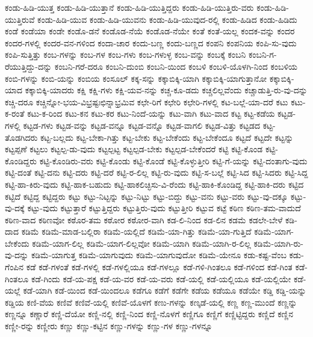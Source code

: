 {ಕಂಡು-ಹಿಡಿ-ಯುತ್ತ
ಕಂಡು-ಹಿಡಿ-ಯುತ್ತಾನೆ
ಕಂಡು-ಹಿಡಿ-ಯುತ್ತಿದ್ದರು
ಕಂಡು-ಹಿಡಿ-ಯುತ್ತಿರು-ವರು
ಕಂಡು-ಹಿಡಿ-ಯುತ್ತಿರುವೆ
ಕಂಡು-ಹಿಡಿ-ಯುವ
ಕಂಡು-ಹಿಡಿ-ಯುವನು
ಕಂಡು-ಹಿಡಿ-ಯುವುದ-ರಲ್ಲಿ
ಕಂಡು-ಹಿಡಿದ
ಕಂಡು-ಹಿಡಿದು
ಕಂಡೆ
ಕಂಡೆಯಾ
ಕಂಡೇ
ಕಂಡೊ-ಡನೆ
ಕಂಡೊಡ-ನೆಯೆ
ಕಂಡೊಡ-ನೆಯೇ
ಕಂತೆ
ಕಂತೆ-ಯಲ್ಲ
ಕಂದಕ-ವನ್ನು
ಕಂದರ
ಕಂದರ-ಗಳಲ್ಲಿ
ಕಂದರ-ವನ-ಗಳಿಂದ
ಕಂದಾ-ಚಾರ
ಕಂದು-ಬಣ್ಣ
ಕಂದು-ಬಣ್ಣದ
ಕಂಪನಿ
ಕಂಪನಿಯ
ಕಂಪಿ-ಸು-ವುದು
ಕಂಪಿ-ಸುತ್ತಿತ್ತು
ಕಂಬ-ಗಳನ್ನು
ಕಂಬ-ಗಳ
ಕಂಬ-ಗಳು
ಕಂಬ-ಗಳುಳ್ಳ
ಕಂಬ-ವನ್ನು
ಕಂಬಕ್ಕೆ
ಕಂಬನಿ
ಕಂಬನಿ-ಗ-ರೆಯುತ್ತಿದ್ದು-ದನ್ನು
ಕಂಬನಿ-ಗರೆ-ದರೂ
ಕಂಬನಿ-ದುಂಬಿ
ಕಂಬನಿ-ಯಿಂದ
ಕಂಬಳಿ
ಕಂಬಳಿ-ಯೊಳಗಿ-ನಿಂದ
ಕಂಬಳಿಯ
ಕಂಬಿ-ಗಳನ್ನು
ಕಂಬಿ-ಯನ್ನು
ಕಂಬಿಯ
ಕಂಸೂಲ್
ಕಕ್ಕ-ಸನ್ನು
ಕಕ್ಕಾಬಿಕ್ಕಿ-ಯಾಗಿ
ಕಕ್ಕಾಬಿಕ್ಕಿ-ಯಾಗುತ್ತಾನೋ
ಕಕ್ಕಾಬಿಕ್ಕಿ-ಯಾದ
ಕಕ್ಕಾಬಿಕ್ಕಿ-ಯಾದರು
ಕಕ್ಷಿ
ಕಕ್ಷಿ-ಗಳು
ಕಕ್ಷಿ-ಯವ-ನನ್ನು
ಕಚ್ಚ-ಕೂ-ಡದು
ಕಚ್ಚಲಿಲ್ಲವೆಂದು
ಕಚ್ಚಾಡುತ್ತಿ-ರು-ವು-ದನ್ನು
ಕಚ್ಚಿ-ದರೂ
ಕಚ್ಚಿನ್ನೋ-ಭಯ-ವಿಭ್ರಷ್ಟಃಛಿನ್ನಾಭ್ರಮಿವ
ಕಛೇ-ರಿಗೆ
ಕಛೇರಿ
ಕಛೇರಿ-ಗಳಲ್ಲಿ
ಕಟ-ಬಲ್ಲೆ-ಯಾ-ದರೆ
ಕಟು
ಕಟು-ಕ-ರಂತೆ
ಕಟು-ಕ-ರಿಂದ
ಕಟು-ಕನ
ಕಟು-ಕರ
ಕಟು-ನಿಂದೆ-ಯನ್ನು
ಕಟು-ವಾಗಿ
ಕಟು-ವಾದ
ಕಟ್ಟ
ಕಟ್ಟ-ಕಡೆಯ
ಕಟ್ಟಡ-ಗಳಲ್ಲಿ
ಕಟ್ಟಡ-ಗಳು
ಕಟ್ಟಡ-ವನ್ನು
ಕಟ್ಟಡ-ವನ್ನೂ
ಕಟ್ಟಡ-ವನ್ನೊ
ಕಟ್ಟಡ-ವಾಗಲಿ
ಕಟ್ಟಡ-ವಿತ್ತು
ಕಟ್ಟಡದ
ಕಟ್ಟ-ತೊಡಗಿದರು
ಕಟ್ಟ-ಬಲ್ಲದು
ಕಟ್ಟ-ಬೇಕಾ-ಗಿತ್ತು
ಕಟ್ಟ-ಬೇಕು
ಕಟ್ಟ-ಬೇಕೆಂದು
ಕಟ್ಟ-ಬೇಕೆಂದೂ
ಕಟ್ಟದೆ
ಕಟ್ಟದೇ
ಕಟ್ಟನ್ನು
ಕಟ್ಟಪ್ಪಣೆ
ಕಟ್ಟಲು
ಕಟ್ಟಲ್ಪ-ಡು-ವುದು
ಕಟ್ಟಲ್ಪಟ್ಟ
ಕಟ್ಟಲ್ಪಡ-ಬೇಕು
ಕಟ್ಟಲ್ಪಡ-ಬೇಕೆಂದರೆ
ಕಟ್ಟಿ
ಕಟ್ಟಿ-ಕೊಂಡ
ಕಟ್ಟಿ-ಕೊಂಡಿದ್ದರು
ಕಟ್ಟಿ-ಕೊಂಡಿರು-ವರು
ಕಟ್ಟಿ-ಕೊಂಡು
ಕಟ್ಟಿ-ಕೊಂಡೆ
ಕಟ್ಟಿ-ಕೊಳ್ಳುತ್ತೀರಿ
ಕಟ್ಟಿ-ಗೆ-ಯನ್ನು
ಕಟ್ಟಿ-ದಂತಾಗು-ವುದು
ಕಟ್ಟಿ-ದಂತೆ
ಕಟ್ಟಿ-ದನು
ಕಟ್ಟಿ-ದರು
ಕಟ್ಟಿ-ದರೆ
ಕಟ್ಟಿ-ರ-ಲಿಲ್ಲ
ಕಟ್ಟಿ-ರು-ವುದು
ಕಟ್ಟಿ-ಸ-ಬಲ್ಲೆ
ಕಟ್ಟಿ-ಸಿದ
ಕಟ್ಟಿ-ಸಿದರು
ಕಟ್ಟಿ-ಸಿದ್ದ
ಕಟ್ಟಿ-ಹಾ-ಕಿರು-ವುದು
ಕಟ್ಟಿ-ಹಾಕ-ಬಹುದು
ಕಟ್ಟಿ-ಹಾಕಲಿಚ್ಛಿಸು-ವಿ-ರೆಂದು
ಕಟ್ಟಿ-ಹಾಕಿ-ಕೊಂಡಿದ್ದ
ಕಟ್ಟಿ-ಹಾಕಿ-ದರು
ಕಟ್ಟಿದ
ಕಟ್ಟಿದೆ
ಕಟ್ಟಿದ್ದ
ಕಟ್ಟಿದ್ದರು
ಕಟ್ಟು
ಕಟ್ಟು-ನಿಟ್ಟನ್ನು
ಕಟ್ಟು-ನಿಟ್ಟು
ಕಟ್ಟು-ಬಿದ್ದು
ಕಟ್ಟು-ವನು
ಕಟ್ಟು-ವರು
ಕಟ್ಟು-ವು-ದಕ್ಕೂ
ಕಟ್ಟು-ವು-ದಕ್ಕೆ
ಕಟ್ಟು-ವುದು
ಕಟ್ಟುತ್ತಾರೆ
ಕಟ್ಟುತ್ತಿದ್ದರು
ಕಟ್ಟುತ್ತಿರು-ವುದು
ಕಟ್ಟುತ್ತೀರಿ
ಕಟ್ಟುವ
ಕಟ್ಟೆ
ಕಠಿಣ
ಕಠಿಣ-ತಮ-ವಾದುದೆ
ಕಠಿಣ-ವಾದ
ಕಠಿಣವೋ
ಕಠೊರ-ತಮ
ಕಠೋರ
ಕಠೋರ-ವಾಗಿ
ಕಡ-ಲಿ-ನಿಂದ
ಕಡ-ಲಿನ
ಕಡಮೆ
ಕಡಲೇ-ಬೇಳೆ
ಕಡಿ-ದಾದ
ಕಡಿಮೆ
ಕಡಿಮೆ-ಮಾಡ-ಬಲ್ಲಿರಾ
ಕಡಿಮೆ-ಯಲ್ಲಿದೆ
ಕಡಿಮೆ-ಯಾ-ಗಿತ್ತು
ಕಡಿಮೆ-ಯಾ-ಗುತ್ತಿದೆ
ಕಡಿಮೆ-ಯಾಗ-ಬೇಕೆಂದು
ಕಡಿಮೆ-ಯಾಗ-ಲಿಲ್ಲ
ಕಡಿಮೆ-ಯಾಗ-ಲಿಲ್ಲವೋ
ಕಡಿಮೆ-ಯಾಗಿ
ಕಡಿಮೆ-ಯಾಗಿ-ರ-ಲಿಲ್ಲ
ಕಡಿಮೆ-ಯಾಗಿ-ರು-ವು-ದನ್ನು
ಕಡಿಮೆ-ಯಾಗುತ್ತ
ಕಡಿಮೆ-ಯಾಗುವುದು
ಕಡಿಮೆ-ಯಾಗುವುದೋ
ಕಡಿಮೆ-ಯೇನೂ
ಕಡು-ಕಷ್ಟ-ವೆಂಬ
ಕಡು-ಗೆಂಪಿನ
ಕಡೆ
ಕಡೆ-ಗಳಂತೆ
ಕಡೆ-ಗಳಲ್ಲಿ
ಕಡೆ-ಗಳಲ್ಲಿಯೂ
ಕಡೆ-ಗಳಲ್ಲೂ
ಕಡೆ-ಗಳಿ-ಗಿಂತಲೂ
ಕಡೆ-ಗಳಿಂದ
ಕಡೆ-ಗಿಂತ
ಕಡೆ-ಗಿಂತಲೂ
ಕಡೆ-ಗಿಂದು
ಕಡೆ-ಯ-ಪಕ್ಷ
ಕಡೆ-ಯ-ವರ
ಕಡೆ-ಯ-ವರು
ಕಡೆ-ಯಲ್ಲಿ
ಕಡೆ-ಯಲ್ಲಿಯೂ
ಕಡೆ-ಯಲ್ಲಿಯೇ
ಕಡೆ-ಯಲ್ಲೆ
ಕಡೆ-ಯಾಗಿ
ಕಡೆ-ಯಿಂದ
ಕಡೆ-ಯಿಂದಲೂ
ಕಡೆಗೂ
ಕಡೆಗೆ
ಕಡೆಗೇ
ಕಡೆಯ
ಕಡೆಯೂ
ಕಡೆಯೇ
ಕಡ್ಡಿ
ಕಡ್ಡಿ-ಯನ್ನು
ಕಡ್ಡಿಯ
ಕಣಿ-ವೆಯ
ಕಣಿವೆ
ಕಣಿವೆ-ಯಲ್ಲಿ
ಕಣಿವೆ-ಯೊಳಗೆ
ಕಣು-ಗಳನ್ನು
ಕಣ್ಕಡೆ-ಯಲ್ಲಿ
ಕಣ್ಣ
ಕಣ್ಣ-ಮುಂದೆ
ಕಣ್ಣನ್ನು
ಕಣ್ಣನ್ನೂ
ಕಣ್ಣಾರೆ
ಕಣ್ಣಿ-ದೆಯೋ
ಕಣ್ಣಿ-ನಲ್ಲಿ
ಕಣ್ಣಿ-ನಿಂದ
ಕಣ್ಣಿ-ನೊಳಗೆ
ಕಣ್ಣಿಗೂ
ಕಣ್ಣಿಗೆ
ಕಣ್ಣಿಟ್ಟಿದ್ದರು
ಕಣ್ಣಿದೆ
ಕಣ್ಣಿನ
ಕಣ್ಣೀ-ರನ್ನು
ಕಣ್ಣೀರು
ಕಣ್ಣು
ಕಣ್ಣು-ಕಟ್ಟಿನ
ಕಣ್ಣು-ಗಳನ್ನು
ಕಣ್ಣು-ಗಳ
ಕಣ್ಣು-ಗಳನ್ನೂ
}
